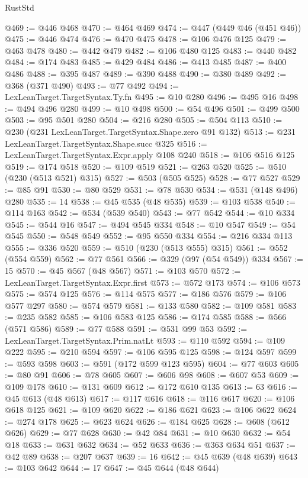 \begin{lexlean}{RustStd}
\begin{coremodule}
@469 := @446 @468
@470 := @464 @469
@474 := @447 (@449 @46 (@451 @46))
@475 := @446 @474
@476 := @470 @475
@478 := @106 @476 @125
@479 := @463 @478
@480 := @442 @479
@482 := @106 @480 @125
@483 := @440 @482
@484 := @174 @483
@485 := @429 @484
@486 := @413 @485
@487 := @400 @486
@488 := @395 @487
@489 := @390 @488
@490 := @380 @489
@492 := @368 (@371 @490)
@493 := @77 @492
@494 := LexLeanTarget.TargetSyntax.Ty.fn
@495 := @10 @280
@496 := @495 @16
@498 := @494 @496 @280
@499 := @10 @498
@500 := @54 @496
@501 := @499 @500
@503 := @95 @501 @280
@504 := @216 @280
@505 := @504 @113
@510 := @230 (@231 LexLeanTarget.TargetSyntax.Shape.zero @91 @132)
@513 := @231 LexLeanTarget.TargetSyntax.Shape.succ @325
@516 := LexLeanTarget.TargetSyntax.Expr.apply @108 @240
@518 := @106 @516 @125
@519 := @174 @518
@520 := @109 @519
@521 := @263 @520
@525 := @510 (@230 (@513 @521) @315)
@527 := @503 (@505 @525)
@528 := @77 @527
@529 := @85 @91
@530 := @80 @529
@531 := @78 @530
@534 := @531 (@148 @496) @280
@535 := 14
@538 := @45 @535 (@48 @535)
@539 := @103 @538
@540 := @114 @163
@542 := @534 (@539 @540)
@543 := @77 @542
@544 := @10 @334
@545 := @544 @16
@547 := @494 @545 @334
@548 := @10 @547
@549 := @54 @545
@550 := @548 @549
@552 := @95 @550 @334
@554 := @216 @334 @113
@555 := @336 @520
@559 := @510 (@230 (@513 @555) @315)
@561 := @552 (@554 @559)
@562 := @77 @561
@566 := @329 (@97 (@54 @549)) @334
@567 := 15
@570 := @45 @567 (@48 @567)
@571 := @103 @570
@572 := LexLeanTarget.TargetSyntax.Expr.first
@573 := @572 @173
@574 := @106 @573
@575 := @574 @125
@576 := @114 @575
@577 := @186 @576
@579 := @106 @577 @297
@580 := @574 @579
@581 := @133 @580
@582 := @109 @581
@583 := @235 @582
@585 := @106 @583 @125
@586 := @174 @585
@588 := @566 (@571 @586)
@589 := @77 @588
@591 := @531 @99 @53
@592 := LexLeanTarget.TargetSyntax.Prim.natLt
@593 := @110 @592
@594 := @109 @222
@595 := @210 @594
@597 := @106 @595 @125
@598 := @124 @597
@599 := @593 @598
@603 := @591 (@172 @599 @123 @595)
@604 := @77 @603
@605 := @80 @91
@606 := @78 @605
@607 := @606 @98
@608 := @607 @53
@609 := @109 @178
@610 := @131 @609
@612 := @172 @610 @135
@613 := 63
@616 := @45 @613 (@48 @613)
@617 := @117 @616
@618 := @116 @617
@620 := @106 @618 @125
@621 := @109 @620
@622 := @186 @621
@623 := @106 @622
@624 := @274 @178
@625 := @623 @624
@626 := @184 @625
@628 := @608 (@612 @626)
@629 := @77 @628
@630 := @42 @84
@631 := @10 @630
@632 := @54 @18
@633 := @631 @632
@634 := @52 @633
@636 := @363 @634 @51
@637 := @42 @89
@638 := @207 @637
@639 := 16
@642 := @45 @639 (@48 @639)
@643 := @103 @642
@644 := 17
@647 := @45 @644 (@48 @644)

\end{coremodule}
\end{lexlean}
